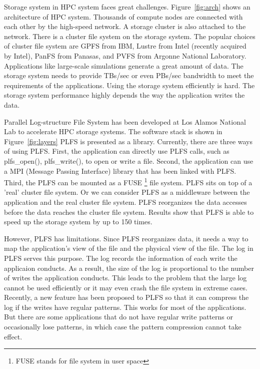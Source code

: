 \documentclass{acm_proc_article-sp}
\begin{document}
Storage system in HPC system faces great challenges.
Figure~\ref{fig:arch} shows an architecture of
HPC system. Thousands of compute nodes are connected
with each other by the high-speed network. A storage
cluster is also attached to the network. There is
a cluster file system on the storage system. The popular
choices of cluster file system are GPFS from IBM,
Lustre from Intel (recently acquired by Intel),
PanFS from Panasas, and PVFS from Argonne 
National Laboratory. Applications like large-scale
simulations generate a great amount of data. The storage
system needs to provide TBs/sec or even PBs/sec
bandwidth to meet the requirements of the applications.
Using the storage system efficiently is hard. The
storage system performance highly depends the way the
application writes the data.

Parallel Log-structure File System has been developed
at Los Alamos National Lab to accelerate HPC storage
systems. The software stack is shown in Figure~\ref{fig:layers}
PLFS is presented as a library. Currently, there
are three ways of using PLFS. First, the application
can directly use PLFS calls, such as plfs\_open(),
plfs\_write(), to open or write a file. 
Second, the application can use a MPI (Message Passing
Interface) library that has been linked with PLFS. 
Third, the PLFS can be mounted as a FUSE 
\footnote{FUSE stands for file system in user space}
file system.
PLFS sits on top of a 'real' cluster file system.
Or we can consider PLFS as a middleware between
the application and the real cluster file system.
PLFS reorganizes the data accesses before the
data reaches the cluster file system. 
Results show that PLFS is able to speed up
the storage system by up to 150 times. 

However, PLFS has limitations. Since PLFS reorganizes
data, it needs a way to map the application's view
of the file and the physical view of the file. 
The log in PLFS serves this purpose. The log
records the information of each write the applicaion
conducts. As a result, the size of the log
is proportional to the number of writes the
application conducts. This leads to the problem
that the large log cannot be used efficiently
or it may even crash the file system in extreme
cases. Recently, a new feature has been proposed
to PLFS so that it can compress the log if the 
writes have regular patterns. This works
for most of the applications. But there are
some applications that do not have regular 
write patterns or occasionally lose patterns,
in which case the pattern compression cannot
take effect. 
\end{document}
